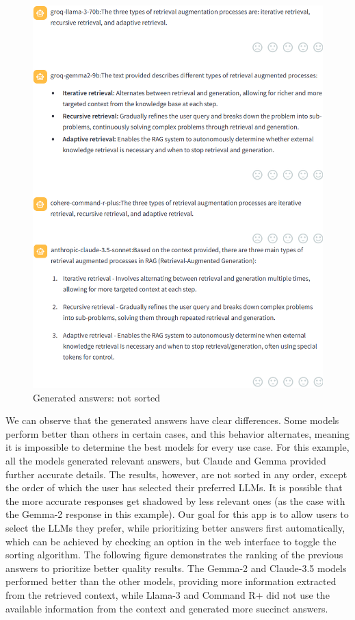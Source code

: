 \begin{figure}[H]
    \centering
    \includegraphics[width=.8\linewidth]{./figures/app-answers.png}
    \caption{Generated answers: not sorted}
\end{figure}
We can observe that the generated answers have clear differences. Some models perform better than others in certain cases, and this behavior alternates, meaning it is impossible to determine the best models for every use case. For this example, all the models generated relevant answers, but Claude and Gemma provided further accurate details. The results, however, are not sorted in any order, except the order of which the user has selected their preferred LLMs. It is possible that the more accurate responses get shadowed by less relevant ones (as the case with the Gemma-2 response in this example). Our goal for this app is to allow users to select the LLMs they prefer, while prioritizing better answers first automatically, which can be achieved by checking an option in the web interface to toggle the sorting algorithm.\newline
The following figure demonstrates the ranking of the previous answers to prioritize better quality results.\newline
The Gemma-2 and Claude-3.5 models performed better than the other models, providing more information extracted from the retrieved context, while Llama-3 and Command R+ did not use the available information from the context and generated more succinct answers.\newline
